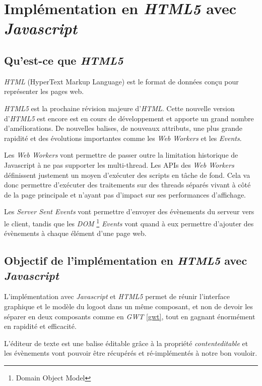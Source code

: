 \section{Implémentation en \emph{HTML5} avec \emph{Javascript}}
	\label{sec:html5}
  \subsection{Qu'est-ce que \emph{HTML5}}
  
	\emph{HTML} (HyperText Markup Language) est le format de données conçu pour 
	représenter les pages web. 

	\emph{HTML5} est la prochaine révision majeure d'\emph{HTML}. 
	Cette nouvelle version d'\emph{HTML5} est encore est en cours de 
	développement et apporte un grand nombre d'améliorations.
	De nouvelles balises, de nouveaux attributs, une plus grande rapidité et des
	évolutions importantes comme les \emph{Web Workers} et les \emph{Events}.
	
	Les \emph{Web Workers} vont permettre de passer outre la limitation 
	historique de Javascript à ne pas supporter les multi-thread.
	Les APIs des \emph{Web Workers} définissent justement un moyen d’exécuter 
	des scripts en tâche de fond. Cela va donc permettre d’exécuter des 
	traitements sur des threads séparés vivant à côté de la page principale et 
	n’ayant pas d’impact sur ses performances d’affichage. 
	
	Les \emph{Server Sent Events} vont permettre d'envoyer des évènements du 
	serveur vers le client, tandis que les \emph{DOM}
	\footnote{Domain Object Model} \emph{Events} vont quand à eux	permettre 
	d'ajouter des évènements à chaque élément d'une page web.
	
	\subsection{Objectif de l'implémentation en \emph{HTML5} avec
		\emph{Javascript}}
	
	L'implémentation avec \emph{Javascript} et \emph{HTML5} permet de réunir 
	l'interface graphique et le modèle du logoot dans un même composant, et non de
	devoir les séparer en deux composants comme en \emph{GWT} \ref{gwt}, tout en gagnant énormément en rapidité et efficacité.
	
	L'éditeur de texte est une balise éditable grâce à la propriété 
	\emph{contenteditable} et les évènements vont pouvoir être récupérés et 
	ré-implémentés à notre bon vouloir.
	
